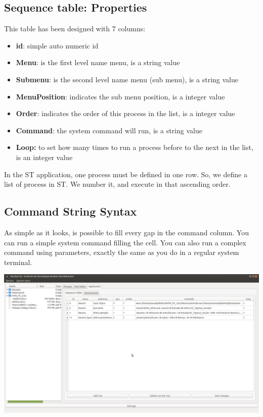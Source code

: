 \documentclass[a4paper,10pt]{article}
\begin{document}
\subsection{Sequence table: Properties}
This table has been designed with 7 columns:

\begin{itemize}
    \item \textbf{id}: simple auto numeric id
    \item \textbf{Menu}: is the first level name menu, is a string value
    \item \textbf{Submenu}: is the second level name menu (sub menu), is a string value
    \item \textbf{MenuPosition}: indicates the sub menu position, is a integer value
    \item \textbf{Order}: indicates the order of this process in the list, is a integer value
    \item \textbf{Command}: the system command will run, is a string value
    \item \textbf{Loop:} to set how many times to run a process before to the next in the list, is an integer value
\end{itemize}

In the ST application, one process must be defined in one row. So, we define a list of process in ST. We number it, and execute in that ascending order.

\subsection{Command String Syntax}

As simple as it looks, is possible to fill every gap in the command column. You can run a simple system command filling the cell. You can also run a complex command using parameters, exactly the same as you do in a regular system terminal.

\begin{center}
 \includegraphics[width=\textwidth]{img/sequenceTable.png}
\end{center}
\end{document}
